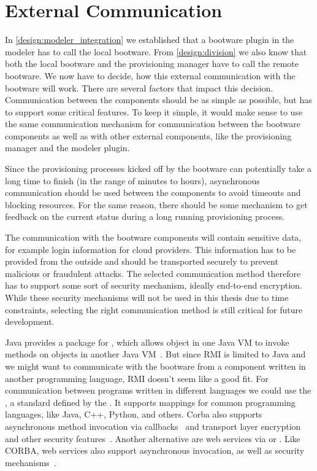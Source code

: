\section{External Communication}
\label{design:communication}

In \autoref{design:modeler_integration} we established that a bootware plugin in the modeler has to call the local bootware.
From \autoref{design:division} we also know that both the local bootware and the provisioning manager have to call the remote bootware.
We now have to decide, how this external communication with the bootware will work.
There are several factors that impact this decision.
Communication between the components should be as simple as possible, but has to support some critical features.
To keep it simple, it would make sense to use the same communication mechanism for communication between the bootware components as well as with other external components, like the provisioning manager and the modeler plugin.

Since the provisioning processes kicked off by the bootware can potentially take a long time to finish (in the range of minutes to hours), asynchronous communication should be used between the components to avoid timeouts and blocking resources.
For the same reason, there should be some mechanism to get feedback on the current status during a long running provisioning process.

The communication with the bootware components will contain sensitive data, for example login information for cloud providers.
This information has to be provided from the outside and should be transported securely to prevent malicious or fraudulent attacks.
The selected communication method therefore has to support some sort of security mechanism, ideally end-to-end encryption.
While these security mechanisms will not be used in this thesis due to time constraints, selecting the right communication method is still critical for future development.

Java provides a package for , which allows object in one Java VM to invoke methods on objects in another Java VM~\autocite{rmi}.
But since RMI is limited to Java and we might want to communicate with the bootware from a component written in another programming language, RMI doesn't seem like a good fit.
For communication between programs written in different languages we could use the , a standard defined by the .
It supports mappings for common programming languages, like Java, C++, Python, and others.
Corba also supports asynchronous method invocation via callbacks~\autocite{corba:async} and transport layer encryption and other security features~\autocite{corba:security}.
Another alternative are web services via  or .
Like CORBA, web services also support asynchronous invocation, as well as security mechanisms~\autocite{ws:security}.

